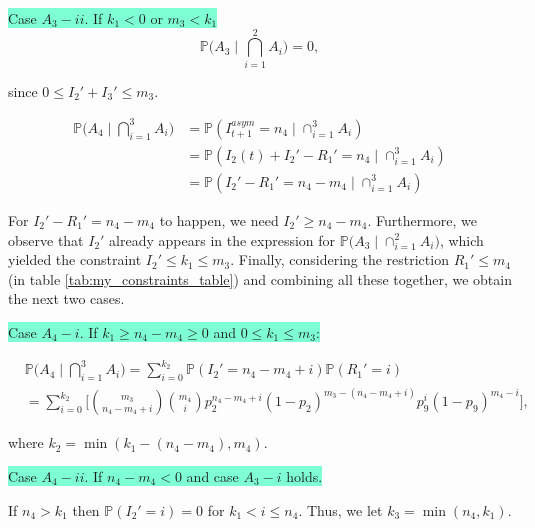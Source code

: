 \documentclass[a4paper]{article}
\theoremstyle{remark}
\begin{document}

\medskip
\colorbox{Aquamarine}{Case $A_3-ii$. If $k_1<0$ or $m_3 < k_1$} 
\[\mathbb{P}\bigg( A_{3}\mid \bigcap_{i=1}^{2}A_{i}\bigg) =0,\]

since $0\leq I_{2}'+I_{3}'\leq m_3$.
\medskip

\hline

\medskip
\begin{align}
   \mathbb{P}\bigg(A_{4}\mid \bigcap_{i=1}^{3}A_{i}\bigg)&=\mathbb{P}(I_{t+1}^{asym}=n_4 \mid \cap_{i=1}^{3}A_{i}) \\
   &= \mathbb{P}(I_2(t)+I_{2}'-R_{1}'=n_4 \mid \cap_{i=1}^{3}A_{i} )\\
   &= \mathbb{P}(I_{2}'-R_{1}'=n_4-m_4 \mid \cap_{i=1}^{3}A_{i} )
   \label{eq:asym}
\end{align}

For $I_{2}'-R_{1}'=n_4-m_4$ to happen, we need $I_{2}' \geq n_4-m_4$. Furthermore, we observe that $I_{2}'$ already appears in the expression for $\mathbb{P}\big(A_{3}\mid \cap_{i=1}^{2}A_{i}\big)$, which yielded the constraint $I_{2}'\leq k_1\leq m_3$. Finally, considering the restriction $R_{1}'\leq m_4$ (in table \ref{tab:my_constraints_table}) and combining all these together, we obtain the next two cases. %

\medskip
\colorbox{Aquamarine}{Case $A_4-i$. If $k_1\geq n_4-m_4\geq 0$ and $0\leq k_1\leq m_3$:}

\begin{equation*}
\begin{split}
&\mathbb{P}\bigg(A_{4}\mid \bigcap_{i=1}^{3}A_{i}\bigg)= \sum_{i=0}^{k_2} \mathbb{P}(I_{2}'=n_4-m_4+i)\mathbb{P}(R_{1}'=i)\\
&= \sum_{i=0}^{k_2}\Bigg[{m_3 \choose n_4-m_4+i}{m_4 \choose i}p_2^{n_4-m_4+i}(1-p_2)^{m_3-(n_4-m_4+i)}p_9^{i}(1-p_9)^{m_4-i}\Bigg],
\end{split}
\end{equation*}

where $k_2=\min(k_1-(n_4-m_4),m_4)$. 

\medskip
\colorbox{Aquamarine}{Case $A_4-ii$. If $n_4-m_4< 0$ and case $A_3-i$ holds.}

If $n_4> k_1$ then $\mathbb{P}(I_{2}'=i)=0$ for $k_1< i \leq n_4$. Thus, we let $k_3=\min(n_4, k_1)$.
\end{document}
